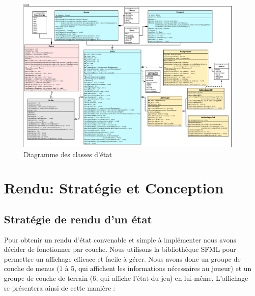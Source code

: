 \documentclass[a4paper,12pt]{article}
\begin{document}
\begin{figure}[hbt!]
    \centering
    \includegraphics[width =.75\paperwidth, angle=0]{images/state.png}
    \caption{Diagramme des classes d'état}
    \label{fig:diaClasseEtat}
\end{figure}



\clearpage
\section{Rendu: Stratégie et Conception}

\subsection{Stratégie de rendu d'un état}
Pour obtenir un rendu d'état convenable et simple à implémenter nous avons décider de fonctionner par couche. Nous utilisons la bibliothèque SFML pour permettre un affichage efficace et facile à gérer. Nous avons donc un groupe de couche de menus (1 à 5, qui affichent les informations nécessaires au joueur) et un groupe de couche de terrain (6, qui affiche l'état du jeu) en lui-même. L'affichage se présentera ainsi de cette manière :
\end{document}

